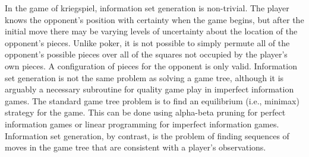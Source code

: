 \documentclass[11pt]{article}
\begin{document}
In the game of kriegspiel, information set generation is non-trivial.  The player knows the opponent's position with certainty when the game begins, but after the initial move there may be varying levels of uncertainty about the location of the opponent's pieces.  Unlike poker, it is not possible to simply permute all of the opponent's possible pieces over all of the squares not occupied by the player's own pieces.  A configuration of pieces for the opponent is only valid.
Information set generation is not the same problem as solving a game tree, although it is arguably a necessary subroutine for quality game play in imperfect information games. The standard game tree problem is to find an equilibrium (i.e., minimax) strategy for the game. This can be done using alpha-beta pruning for perfect information games or linear programming for imperfect information games. Information set generation, by contrast, is the problem of finding sequences of moves in the game tree that are consistent with a player's observations.
\end{document}
